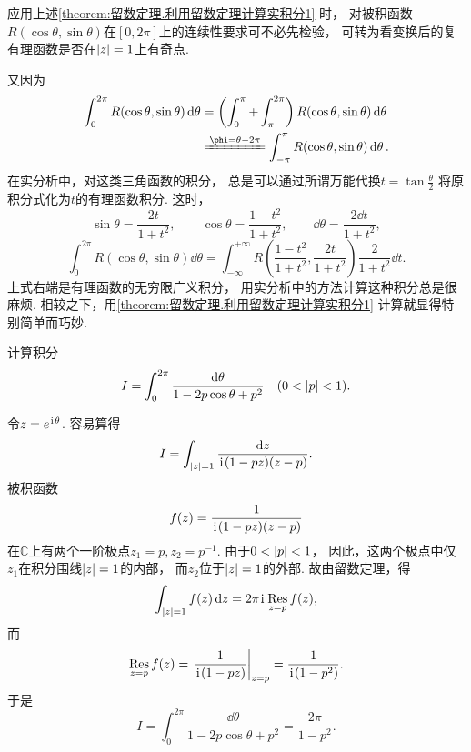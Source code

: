 应用上述\cref{theorem:留数定理.利用留数定理计算实积分1} 时，
对被积函数\(R(\cos\theta,\sin\theta)\)在\([0,2\pi]\)上的连续性要求可不必先检验，
可转为看变换后的复有理函数是否在\(\abs{z}=1\)上有奇点.

又因为\begin{align*}
	\int_0^{2\pi} R(\cos\theta,\sin\theta) \dd{\theta}
	&= \left( \int_0^\pi + \int_{\pi}^{2\pi} \right) R(\cos\theta,\sin\theta) \dd{\theta} \\
	&\xlongequal{\phi=\theta-2\pi} \int_{-\pi}^\pi R(\cos\theta,\sin\theta) \dd{\theta}.
\end{align*}
在实分析中，对这类三角函数的积分，
总是可以通过所谓万能代换\(t = \tan\frac{\theta}{2}\)
将原积分式化为\(t\)的有理函数积分.
这时，\[
	\sin\theta = \frac{2t}{1+t^2},
	\qquad
	\cos\theta = \frac{1-t^2}{1+t^2},
	\qquad
	\dd{\theta} = \frac{2 \dd{t}}{1+t^2},
\]\[
	\int_0^{2\pi} R(\cos\theta,\sin\theta) \dd{\theta}
	= \int_{-\infty}^{+\infty} R\left(\frac{1-t^2}{1+t^2},\frac{2t}{1+t^2}\right) \frac{2}{1+t^2} \dd{t}.
\]
上式右端是有理函数的无穷限广义积分，
用实分析中的方法计算这种积分总是很麻烦.
相较之下，用\cref{theorem:留数定理.利用留数定理计算实积分1} 计算就显得特别简单而巧妙.

\begin{example}[泊松积分]\label{example:留数定理.泊松积分}
计算积分\[
	I = \int_0^{2\pi} \frac{\dd{\theta}}{1-2p\cos\theta+p^2} \quad(0<\abs{p}<1).
\]
\begin{solution}
令\(z=e^{\kern1pt\mathrm{i}\kern1pt\theta}\).
容易算得\[
	I = \int_{\abs{z}=1} \frac{\dd{z}}{\kern1pt\mathrm{i}\kern1pt(1-pz)(z-p)}.
\]
被积函数\[
	f(z) = \frac{1}{\kern1pt\mathrm{i}\kern1pt(1-pz)(z-p)}
\]在\(\mathbb{C}\)上有两个一阶极点\(z_1=p, z_2=p^{-1}\).
由于\(0<\abs{p}<1\)，
因此，这两个极点中仅\(z_1\)在积分围线\(\abs{z}=1\)的内部，
而\(z_2\)位于\(\abs{z}=1\)的外部.
故由留数定理，得\[
	\int_{\abs{z}=1} f(z) \dd{z}
	= 2\pi\kern1pt\mathrm{i}\kern1pt \operatorname*{Res}_{z=p} f(z),
\]而\[
	\Res_{z=p} f(z)
	= \eval{ \frac{1}{\iu(1-pz)} }_{z=p}
	= \frac{1}{\iu(1-p^2)}.
\]
于是\[
	I = \int_0^{2\pi} \frac{\dd{\theta}}{1-2p\cos\theta+p^2}
	= \frac{2\pi}{1-p^2}.
\]
\end{solution}
\end{example}

